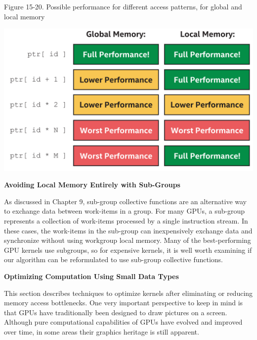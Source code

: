 \hspace*{\fill} \par %
Figure 15-20. Possible performance for different access patterns, for global and local memory
\begin{center}
	\includegraphics[width=1.0\textwidth]{content/chapter-15/images/15}
\end{center}

\hspace*{\fill} \par %
\textbf{Avoiding Local Memory Entirely with Sub-Groups}

As discussed in Chapter 9, sub-group collective functions are an alternative way to exchange data between work-items in a group. For many GPUs, a sub-group represents a collection of work-items processed by a single instruction stream. In these cases, the work-items in the sub-group can inexpensively exchange data and synchronize without using workgroup local memory. Many of the best-performing GPU kernels use subgroups, so for expensive kernels, it is well worth examining if our algorithm can be reformulated to use sub-group collective functions.\par

\hspace*{\fill} \par %
\textbf{Optimizing Computation Using Small Data Types}

This section describes techniques to optimize kernels after eliminating or reducing memory access bottlenecks. One very important perspective to keep in mind is that GPUs have traditionally been designed to draw pictures on a screen. Although pure computational capabilities of GPUs have evolved and improved over time, in some areas their graphics heritage is still apparent.\par

